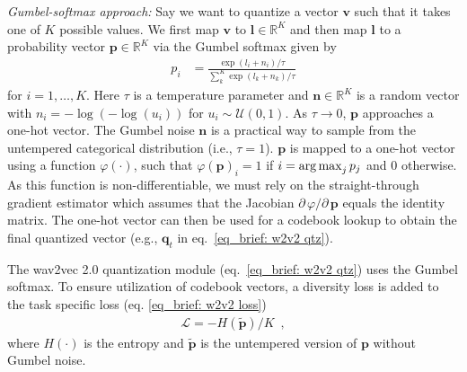 {\textit{Gumbel-softmax approach:} 
Say we want to quantize a vector $\mathbf{v}$ such that it takes one of $K$ possible values. We first map $\mathbf{v}$ to $\mathbf{l} \in \mathbb{R}^K$ and then map $\mathbf{l}$ to a probability vector $\mathbf{p} \in \mathbb{R}^K$ via the Gumbel softmax given by
\begin{align}
    p_i &= \frac{\exp(l_i + n_i) / \tau}{\sum_k^K \exp(l_k + n_k) / \tau} 
\end{align}
for $i=1,\dots,K$. Here $\tau$ is a temperature parameter and $\mathbf{n}\in\mathbb R^K$ is a random vector with $n_i = -\log(-\log(u_i))$ for $u_i \sim \mathcal{U}(0, 1)$.
As  $\tau \rightarrow 0$, $\mathbf{p}$ approaches a one-hot vector. The Gumbel noise $\mathbf{n}$ is a practical way to sample from the untempered categorical distribution (i.e., $\tau = 1$).
$\mathbf{p}$ is mapped to a one-hot vector using a function $\varphi(\cdot)$, such that $\varphi(\mathbf{p})_i = 1$ if $i = \operatorname*{arg\,max}_j p_j$ and $0$ otherwise. 
As this function is non-differentiable, we must rely on the straight-through gradient estimator \cite{bengio_estimating_2013} which assumes that the Jacobian ${\partial \, \varphi}/{\partial \, \mathbf{p}}$ equals the identity matrix. 
The one-hot vector can then be used for a codebook lookup to obtain the final quantized vector (e.g., $\mathbf{q}_t$ in eq.~\ref{eq_brief: w2v2 qtz}).

The wav2vec 2.0 quantization module (eq.~\ref{eq_brief: w2v2 qtz}) uses the Gumbel softmax. To ensure utilization of codebook vectors, a diversity loss is added to the task specific loss (eq. \ref{eq_brief: w2v2 loss})
%
\begin{align}
    \mathcal{L} =  - H(\widetilde{\mathbf{p}}) / K \enspace,
\end{align}
\noindent where $H(\cdot)$ is the entropy and $\widetilde{\mathbf{p}}$ is the untempered version of $\mathbf{p}$ without Gumbel noise.

}
